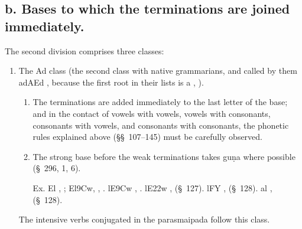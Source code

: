 \subsection{b. Bases to which the terminations are joined immediately.}

\s The second division comprises three classes:

\begin{enumerate}
\item The Ad class (the second class with native grammarians, and called
  by them {\dn adAEd} , because the first root in their lists is
  {\dn a} , ).

  \begin{enumerate}
  \item The terminations are added immediately to the last letter of the
    base; and in the contact of vowels with vowels, vowels with
    consonants, consonants with vowels, and consonants with consonants,
    the phonetic rules explained above (\S\S~107–145) must be carefully
    observed.

  \item The strong base before the weak terminations takes guṇa where
    possible (\S~296, 1, 6).

    Ex. {\dn El} , ; {\dn El\39Cw,} , . {\dn l\?E\39Cw} , . {\dn l\?E\322w} ,
     (\S~127). {\dn lFY} , 
    (\S~128). {\dn al\?} ,  (\S~128).
  \end{enumerate}

  The intensive verbs conjugated in the parasmaipada follow this class.
\end{enumerate}
